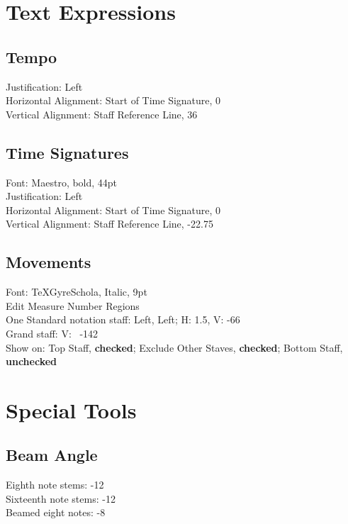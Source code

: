 \documentclass[unicode,hyperfootnotes=false,xetex,colorlinks=true,nofonts,nobib]{tufte-book} %
\begin{document}
\chapter{Text Expressions}
\label{sec:text-expressions}

\section{Tempo}
\label{sec:tempo}

Justification: Left\\
Horizontal Alignment: Start of Time Signature, 0\\
Vertical Alignment: Staff Reference Line, 36

\section{Time Signatures}
\label{sec:time-signatures}

Font: Maestro, bold, 44pt\\
Justification: Left\\
Horizontal Alignment: Start of Time Signature, 0\\
Vertical Alignment: Staff Reference Line, -22.75

\section{Movements}
\label{sec:movements}

Font: TeXGyreSchola, Italic, 9pt\\
Edit Measure Number Regions\\
One Standard notation staff: Left, Left; H: 1.5, V: -66\\
Grand staff: V: ~-142\\
Show on: Top Staff, \textbf{checked}; Exclude Other Staves, \textbf{checked}; Bottom Staff, \textbf{unchecked}

\chapter{Special Tools}
\label{sec:special-tools}

\section{Beam Angle}
\label{sec:beam-angle}

Eighth note stems: -12\\
Sixteenth note stems: -12\\
Beamed eight notes: -8
\end{document}

